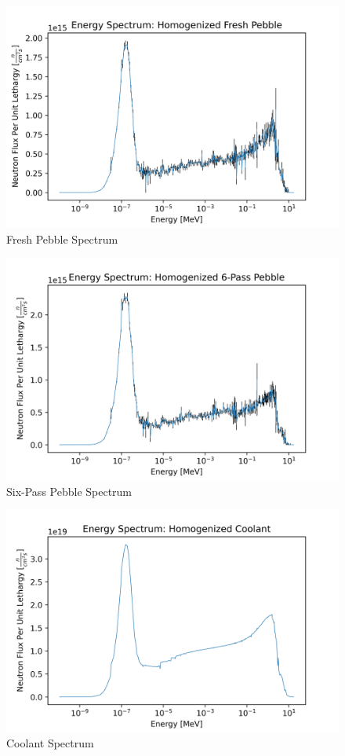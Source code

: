 
\begin{figure}[H]
\centering
  \includegraphics[width=0.95\linewidth]{figures/fresh_spec_homog}
  \caption{Fresh Pebble Spectrum}
  \label{fig:hom-fresh}
\end{figure}

\begin{figure}[H]
\centering
  \includegraphics[width=0.95\linewidth]{figures/6_spec_homog}
  \caption{Six-Pass Pebble Spectrum}
  \label{fig:hom-six}
\end{figure}

\begin{figure}[H]
\centering
  \includegraphics[width=0.95\linewidth]{figures/cool_spec_homog}
  \caption{Coolant Spectrum}
  \label{fig:hom-cool}
\end{figure}
